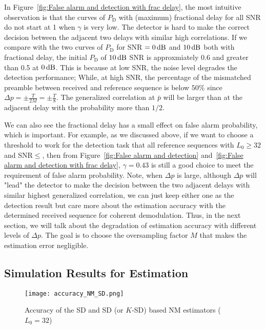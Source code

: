 In Figure~\ref{fig:False alarm and detection with frac delay}, the most intuitive observation is that the curves of $P_{\text{D}}$ with (maximum) fractional delay for all SNR
do not start at 1 when $\gamma$ is very low. The detector is hard to make the correct decision between the adjacent two delays with similar high correlations. 
If we compare with the two curves of $P_{\text{D}}$ for SNR $=\numb{0}\dB$ and $\numb{10}\dB$
both with fractional delay, the initial $P_{\text{D}}$ of $\numb{10}\dB$ SNR is approxmiately 0.6 and greater than 0.5 at $\numb{0}\dB$.
This is because at low SNR, the noise level degrades the detection performance; While, at high SNR, 
the percentage of the mismatched preamble between received and reference sequence 
is below $50\%$ since $\Delta p{=}{\pm}\frac{T}{2M}{=}{\pm}\frac{T}{8}$. The generalized correlation
at $\bar{p}$ will be larger than at the adjacent delay with the probability more than $1/2$.

We can also see the fractional delay has a small effect on false alarm probability, which is important. For example, as we discussed above,
if we want to choose a threshold to work for the detection task that all reference sequences with $L_0 {\geq} 32$
and SNR${\leq}$\dB, then from Figure~\ref{fig:False alarm and detection} and~\ref{fig:False alarm and detection with frac delay},
$\gamma=0.43$ is still a good choice to meet the requirement of false alarm probability. Note, when $\Delta p$ is large, although $\Delta p$ will "lead" the 
detector to make the decision between the two adjacent delays with similar highest generalized correlation,
we can just keep either one as the detection result but care more about the estimation accuracy with the determined received sequence
for coherent demodulation. Thus, in the next section, we will talk about the degradation of estimation accuracy with different levels of $\Delta p$.
The goal is to choose the oversampling factor $M$ that makes the estimation error negligible.

\subsection{Simulation Results for Estimation}

\begin{figure}[t]
    \centerline{\texttt{[image: accuracy\_NM\_SD.png]}}
    \caption{Accuracy of the SD and SD (or $K$-SD) based NM estimators ($L_0=32$)}
    \label{fig:accuracy_NM_SD}
    \end{figure}

